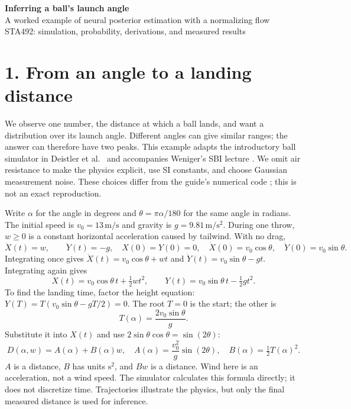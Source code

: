 \documentclass[11pt,a4paper]{article}
\begin{document}
\begin{center}
{\LARGE\bfseries Inferring a ball's launch angle}\\[5pt]
{\large A worked example of neural posterior estimation with a normalizing flow}\\[4pt]
{\small STA492: simulation, probability, derivations, and measured results}
\end{center}

\section*{1. From an angle to a landing distance}
We observe one number, the distance at which a ball lands, and want a
distribution over its launch angle. Different angles can give similar ranges;
the answer can therefore have two peaks. This example adapts the introductory
ball simulator in Deistler et al.\ \cite{guide} and accompanies Weniger's SBI
lecture \cite{lecture}. We omit air resistance to make the physics explicit,
use SI constants, and choose Gaussian measurement noise. These choices differ
from the guide's numerical code \cite{guidecode}; this is not an exact reproduction.

Write $\alpha$ for the angle in degrees and $\theta=\pi\alpha/180$ for the
same angle in radians. The initial speed is $v_0=13\,\mathrm{m/s}$ and gravity
is $g=9.81\,\mathrm{m/s^2}$. During one throw, $w\geq0$ is a constant
horizontal acceleration caused by tailwind. With no drag,
\[
 \ddot X(t)=w,\qquad \ddot Y(t)=-g,
 \quad X(0)=Y(0)=0,\quad
 \dot X(0)=v_0\cos\theta,\quad \dot Y(0)=v_0\sin\theta.
\]
Integrating once gives $\dot X(t)=v_0\cos\theta+wt$ and
$\dot Y(t)=v_0\sin\theta-gt$. Integrating again gives
\[
 X(t)=v_0\cos\theta\,t+\tfrac12wt^2,\qquad
 Y(t)=v_0\sin\theta\,t-\tfrac12gt^2.
\]
To find the landing time, factor the height equation:
$Y(T)=T(v_0\sin\theta-gT/2)=0$. The root $T=0$ is the start; the other is
\[
 T(\alpha)=\frac{2v_0\sin\theta}{g}.
\]
Substitute it into $X(t)$ and use $2\sin\theta\cos\theta=\sin(2\theta)$:
\begin{equation}
 \boxed{D(\alpha,w)=A(\alpha)+B(\alpha)w,\quad
 A(\alpha)=\frac{v_0^2}{g}\sin(2\theta),\quad
 B(\alpha)=\tfrac12T(\alpha)^2.}
 \label{eq:range}
\end{equation}
$A$ is a distance, $B$ has units $\mathrm{s^2}$, and $Bw$ is a distance.
Wind here is an acceleration, not a wind speed. The simulator calculates this
formula directly; it does not discretize time. Trajectories illustrate the
physics, but only the final measured distance is used for inference.
\end{document}
